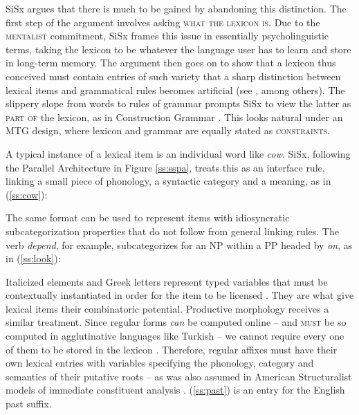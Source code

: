 \documentclass[output=paper,hidelinks]{langscibook}
\begin{document}
SiSx argues that there is much to be gained by abandoning this distinction. The first step of the argument involves asking \textsc{what the lexicon is}. Due to the \textsc{mentalist} commitment, SiSx frames this issue in essentially psycholinguistic terms, taking the lexicon to be whatever the language user has to learn and store in long-term memory. The argument then goes on to show that a lexicon thus conceived must contain entries of such variety that a sharp distinction between lexical items and grammatical rules becomes artificial (see \citealt{jackendoff1997the-architecture, culicover2017multiword, jackendoff2020texture}, among others). The slippery slope from words to rules of grammar prompts SiSx to view the latter as \textsc{part of} the lexicon, as in Construction Grammar \citep{goldberg1995constructions, sag2012sign-based}. This looks natural under an MTG design, where lexicon and grammar are equally stated as \textsc{constraints}.

A typical instance of a lexical item is an individual word like \textit{cow}. SiSx, following the Parallel Architecture in Figure \ref{ss:sspa}, treats this as an interface rule, linking a small piece of phonology, a syntactic category and a meaning, as in (\ref{ss:cow}):



The same format can be used to represent items with idiosyncratic subcategorization properties that do not follow from general linking rules. The verb \textit{depend}, for example, subcategorizes for an NP within a PP headed by \textit{on}, as in (\ref{ss:look}):

 
Italicized elements and Greek letters represent typed variables that must be contextually instantiated in order for the item to be licensed \citep{culicover2019origin}. They are what give lexical items their combinatoric potential.
Productive morphology receives a similar treatment. Since regular forms \textit{can} be computed online -- and \textsc{must} be so computed in agglutinative languages like Turkish  \citep{hankamer1989morphological} -- we cannot require every one of them to be stored in the lexicon \citep{jackendoff1997the-architecture, jackendoff2002foundations}. Therefore, regular affixes must have their own lexical entries with variables specifying the phonology, category and semantics of their putative roots -- as was also assumed in American Structuralist models of immediate constituent analysis \citep{bloomfield1933language}. (\ref{ss:past}) is an entry for the English past suffix.
\end{document}
